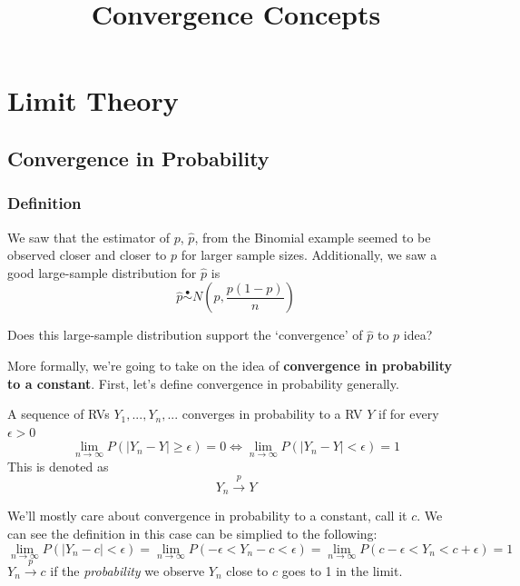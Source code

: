 \documentclass[
]{article}
\title{Convergence Concepts}
\author{}
\date{\vspace{-2.5em}}
\providecommand{\tightlist}{%
  \setlength{\itemsep}{0pt}\setlength{\parskip}{0pt}}
\begin{document}
\maketitle

\hypertarget{limit-theory}{%
\section{Limit Theory}\label{limit-theory}}

\hypertarget{convergence-in-probability}{%
\subsection{Convergence in
Probability}\label{convergence-in-probability}}

\hypertarget{definition}{%
\subsubsection{Definition}\label{definition}}

We saw that the estimator of \(p\), \(\hat{p}\), from the Binomial
example seemed to be observed closer and closer to \(p\) for larger
sample sizes. Additionally, we saw a good large-sample distribution for
\(\hat{p}\) is
\[\hat{p}\stackrel{\bullet}\sim N\left(p, \frac{p(1-p)}{n}\right)\]

Does this large-sample distribution support the `convergence' of
\(\hat{p}\) to \(p\) idea?

More formally, we're going to take on the idea of \textbf{convergence in
probability to a constant}. First, let's define convergence in
probability generally.

\begin{description}
\tightlist
\item[Convergence in Probability]
A sequence of RVs \(Y_1,...,Y_n,...\) converges in probability to a RV
\(Y\) if for every \(\epsilon>0\)
\[\lim_{n\rightarrow\infty}P(|Y_n-Y|\geq \epsilon)=0 \iff 
\lim_{n\rightarrow\infty}P(|Y_n-Y|<\epsilon)=1\] This is denoted as
\[Y_n\stackrel{p}{\rightarrow}Y\]
\end{description}

We'll mostly care about convergence in probability to a constant, call
it \(c\). We can see the definition in this case can be simplied to the
following:
\[\lim_{n\rightarrow\infty}P(|Y_n-c|< \epsilon)=\lim_{n\rightarrow\infty}P(-\epsilon < Y_n-c<\epsilon) =  \lim_{n\rightarrow\infty}P(c-\epsilon < Y_n<c+\epsilon)=1\]
\(Y_n\stackrel{p}\rightarrow c\) if the \emph{probability} we observe
\(Y_n\) close to \(c\) goes to 1 in the limit.
\end{document}
